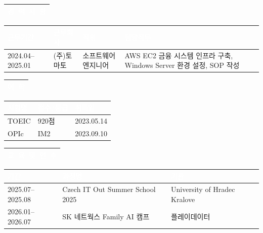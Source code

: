 \documentclass[a4paper, 10pt]{article}
\newcommand{\resumesection}[1]{%
  \vspace{3pt}
  \noindent
  \begin{tabularx}{\textwidth}{|X|}
    \hline
    \rowcolor{navyblue}
    \textcolor{white}{\large\textbf{#1}} \\
    \hline
  \end{tabularx}
  \vspace{1pt}
}
\newcommand{\headercell}[1]{%
  \cellcolor{navyblue}\textcolor{white}{\textbf{#1}}
}
\begin{document}

\resumesection{경\ 력\ 사\ 항}

\begin{tabularx}{\textwidth}{|m{2.8cm}|m{3cm}|m{2.2cm}|X|}
  \hline
  \headercell{근무기간} & \headercell{근무회사} & \headercell{직위} & \headercell{담당직무} \\
  \hline
  2024.04--2025.01 & (주)토마토 & 소프트웨어 엔지니어 & AWS EC2 금융 시스템 인프라 구축, Windows Server 환경 설정, SOP 작성 \\
  \hline
\end{tabularx}


\resumesection{어\ 학}

\begin{tabularx}{\textwidth}{|X|m{2.5cm}|m{2.5cm}|}
  \hline
  \headercell{시험명} & \headercell{점수/등급} & \headercell{취득일} \\
  \hline
  TOEIC & 920점 & 2023.05.14 \\
  \hline
  OPIc & IM2 & 2023.09.10 \\
  \hline
\end{tabularx}


\resumesection{교\ 육\ 및\ 연\ 수}

\begin{tabularx}{\textwidth}{|m{2.8cm}|X|m{3.5cm}|}
  \hline
  \headercell{기간} & \headercell{과정명} & \headercell{기관} \\
  \hline
  2025.07--2025.08 & Czech IT Out Summer School 2025 & University of Hradec Kralove \\
  \hline
  2026.01--2026.07 & SK 네트웍스 Family AI 캠프 & 플레이데이터 \\
  \hline
\end{tabularx}

\end{document}
